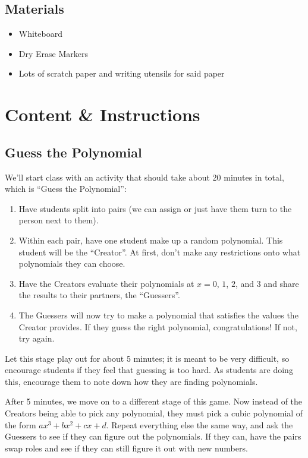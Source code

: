 \subsection{Materials}

\begin{itemize}
    \item Whiteboard
    \item Dry Erase Markers
    \item Lots of scratch paper and writing utensils for said paper
\end{itemize}

\section{Content \& Instructions}

\subsection{Guess the Polynomial}

We'll start class with an activity that should take about 20 minutes in total, which is ``Guess the Polynomial'':
\begin{enumerate}
    \item Have students split into pairs (we can assign or just have them turn to the person next to them).
    \item Within each pair, have one student make up a random polynomial. This student will be the ``Creator''. At first, don't make any restrictions onto what polynomials they can choose.
    \item Have the Creators evaluate their polynomials at $x = 0$, $1$, $2$, and $3$ and share the results to their partners, the ``Guessers''. 
    \item The Guessers will now try to make a polynomial that satisfies the values the Creator provides. If they guess the right polynomial, congratulations! If not, try again.
\end{enumerate}

Let this stage play out for about 5 minutes; it is meant to be very difficult, so encourage students if they feel that guessing is too hard. As students are doing this, encourage them to note down how they are finding polynomials.

After 5 minutes, we move on to a different stage of this game. Now instead of the Creators being able to pick any polynomial, they must pick a cubic polynomial of the form $ax^3+bx^2+cx+d$. Repeat everything else the same way, and ask the Guessers to see if they can figure out the polynomials. If they can, have the pairs swap roles and see if they can still figure it out with new numbers.

